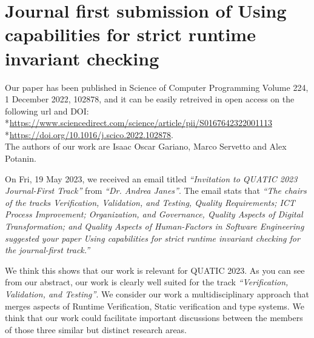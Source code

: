 \documentclass[runningheads]{llncs}
\begin{document}
\section{Journal first submission of Using capabilities for strict runtime invariant checking}

Our paper has been published in Science of Computer Programming Volume 224, 1 December 2022, 102878, and it can be easily retreived in open access on the following url and DOI:
\\*${}_{}$\quad\quad \url{https://www.sciencedirect.com/science/article/pii/S0167642322001113}
\\*${}_{}$\quad\quad \url{https://doi.org/10.1016/j.scico.2022.102878}.\\

\noindent The authors of our work are Isaac Oscar Gariano, Marco Servetto and Alex Potanin.

On Fri, 19 May 2023, we received an email titled \textit{``Invitation to QUATIC 2023 Journal-First Track'' }
from \textit{``Dr. Andrea Janes''}.
The email stats that \textit{``The chairs of the tracks Verification, Validation, and Testing,
Quality Requirements; ICT Process Improvement; Organization, and
Governance, Quality Aspects of Digital Transformation; and Quality
Aspects of Human-Factors in Software Engineering suggested your paper Using capabilities for strict runtime invariant checking for the journal-first track.''}

We think this shows that our work is relevant for QUATIC 2023.
As you can see from our abstract, our work is clearly well suited for the track \textit{``Verification, Validation, and Testing''}.
We consider our work a multidisciplinary approach that merges aspects of Runtime Verification, Static verification and type systems. We think that our work could facilitate important discussions between the members of those three similar but distinct research areas.
\end{document}
